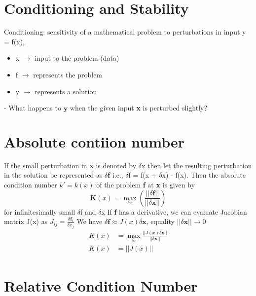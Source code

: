 \documentclass{article}
\begin{document}
\section*{Conditioning and Stability}
\label{sec:con-stab}

Conditioning: sensitivity of a mathematical problem to perturbations in input
\newline\newline
y = f(x),
\begin{itemize}
  \item x $\rightarrow$ input to the problem (data)
  \item f $\rightarrow$ represents the problem
  \item y $\rightarrow$ represents a solution
\end{itemize}
- What happens to $\mathbf{y}$ when the given input \textbf{x} is perturbed slightly?

\section{Absolute contiion number}
\label{sec:abs-cond}

If the small perturbation in \textbf{x} is denoted by $\delta$x then let the resulting perturbation in the solution be represented as $\delta$\textbf{f} i.e., $\delta$f = f(x + $\delta$x) - f(x). Then the absolute condition number $k' = k(x)$ of the problem \textbf{f} at \textbf{x} is given by
\begin{equation}
\mathbf{K}(x) = \max_{\delta x}\left(\frac{||\delta \mathbf{f}||}{||\delta \mathbf{x}||}\right)
\end{equation}
for infinitesimally small $\delta$f and $\delta$x
\newline
If \textbf{f} has a derivative, we can evaluate Jacobian matrix J(x) as $J_{ij} = \frac{\delta \mathbf{f}_i}{\delta x_j}$
\newline
We have $\delta \mathbf{f} \approx J(x)\delta \mathbf{x}$, equality $||\delta \mathbf{x}|| \rightarrow 0$
\begin{equation}
  \begin{split}
    K(x) &= \max_{\delta x}\frac{||J(x)\delta \mathbf{x}||}{||\delta \mathbf{x}||}\\
    K(x) &= ||J(x)||\\
  \end{split}
\end{equation}

\section{Relative Condition Number}
\label{sec:rel-cond}
\end{document}
